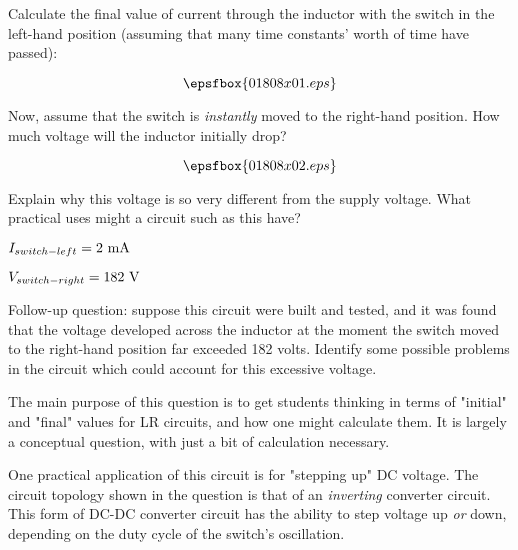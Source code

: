 

Calculate the final value of current through the inductor with the switch in the left-hand position (assuming that many time constants' worth of time have passed):

$$\epsfbox{01808x01.eps}$$

Now, assume that the switch is {\it instantly} moved to the right-hand position.  How much voltage will the inductor initially drop?

$$\epsfbox{01808x02.eps}$$

Explain why this voltage is so very different from the supply voltage.  What practical uses might a circuit such as this have?







$I_{switch-left} = 2 \hbox{ mA}$

$V_{switch-right} = 182 \hbox{ V}$

\vskip 10pt

Follow-up question: suppose this circuit were built and tested, and it was found that the voltage developed across the inductor at the moment the switch moved to the right-hand position far exceeded 182 volts.  Identify some possible problems in the circuit which could account for this excessive voltage.







The main purpose of this question is to get students thinking in terms of "initial" and "final" values for LR circuits, and how one might calculate them.  It is largely a conceptual question, with just a bit of calculation necessary.

One practical application of this circuit is for "stepping up" DC voltage.  The circuit topology shown in the question is that of an {\it inverting} converter circuit.  This form of DC-DC converter circuit has the ability to step voltage up {\it or} down, depending on the duty cycle of the switch's oscillation.




